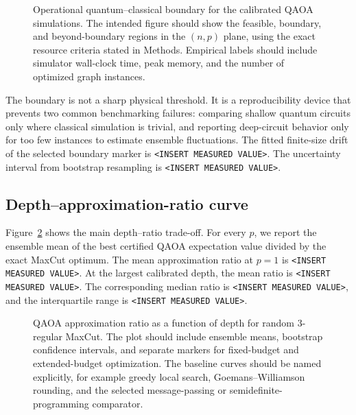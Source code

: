 \documentclass[reprint,aps,longbibliography]{revtex4-2}
\begin{document}
\begin{figure}[t]
\centering
\caption{Operational quantum--classical boundary for the calibrated QAOA simulations. The intended figure should show the feasible, boundary, and beyond-boundary regions in the $(n,p)$ plane, using the exact resource criteria stated in Methods. Empirical labels should include simulator wall-clock time, peak memory, and the number of optimized graph instances.}
\label{fig:boundary}
\end{figure}

The boundary is not a sharp physical threshold. It is a reproducibility device that prevents two common benchmarking failures: comparing shallow quantum circuits only where classical simulation is trivial, and reporting deep-circuit behavior only for too few instances to estimate ensemble fluctuations. The fitted finite-size drift of the selected boundary marker is \texttt{<INSERT MEASURED VALUE>}. The uncertainty interval from bootstrap resampling is \texttt{<INSERT MEASURED VALUE>}.

\subsection{Depth--approximation-ratio curve}

Figure~\ref{fig:depth_ratio} shows the main depth--ratio trade-off. For every $p$, we report the ensemble mean of the best certified QAOA expectation value divided by the exact MaxCut optimum. The mean approximation ratio at $p=1$ is \texttt{<INSERT MEASURED VALUE>}. At the largest calibrated depth, the mean ratio is \texttt{<INSERT MEASURED VALUE>}. The corresponding median ratio is \texttt{<INSERT MEASURED VALUE>}, and the interquartile range is \texttt{<INSERT MEASURED VALUE>}.

\begin{figure}[t]
\centering
\caption{QAOA approximation ratio as a function of depth for random 3-regular MaxCut. The plot should include ensemble means, bootstrap confidence intervals, and separate markers for fixed-budget and extended-budget optimization. The baseline curves should be named explicitly, for example greedy local search, Goemans--Williamson rounding, and the selected message-passing or semidefinite-programming comparator.}
\label{fig:depth_ratio}
\end{figure}
\end{document}
